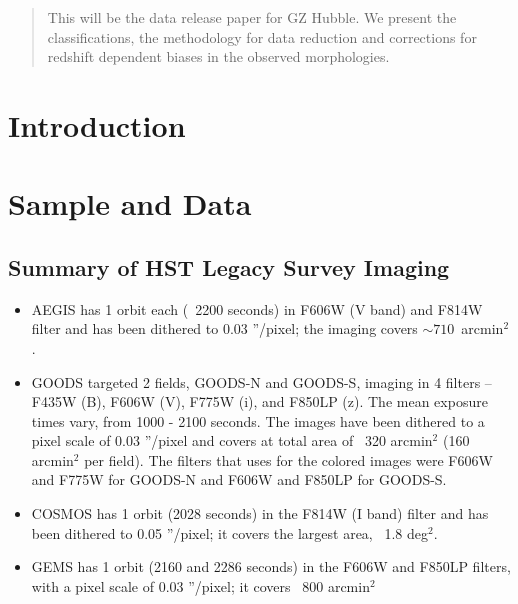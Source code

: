 \documentclass[usenatbib]{mn2e}
\begin{document}
\begin{abstract}

This will be the data release paper for GZ Hubble. We present the classifications, the methodology for data reduction and corrections for redshift dependent biases in the observed morphologies. 

\end{abstract}


\section{Introduction}


\section{Sample and Data} 

\subsection{Summary of HST Legacy Survey Imaging}

\begin{itemize}
\item AEGIS has 1 orbit each (~2200 seconds) in F606W (V band) and F814W filter and has been dithered to 0.03 ''/pixel; the imaging covers $\sim710$~arcmin$^2$.

\item GOODS targeted 2 fields, GOODS-N and GOODS-S, imaging in 4 filters -- F435W (B), F606W (V), F775W (i), and F850LP (z). The mean exposure times vary, from 1000 - 2100 seconds. The images have been dithered to a pixel scale of 0.03 ''/pixel and covers at total area of ~320 arcmin$^2$ (160 arcmin$^2$ per field). The filters that \citet{gri12} uses for the colored images were F606W and F775W for GOODS-N and F606W and F850LP for GOODS-S.

\item COSMOS has 1 orbit (2028 seconds) in the F814W (I band) filter and has been dithered to 0.05 ''/pixel; it covers the largest area, ~1.8 deg$^2$. 

\item GEMS has 1 orbit (2160 and 2286 seconds) in the F606W and F850LP filters, with a pixel scale of 0.03 ''/pixel; it covers ~800 arcmin$^2$
\end{itemize}
\end{document}

